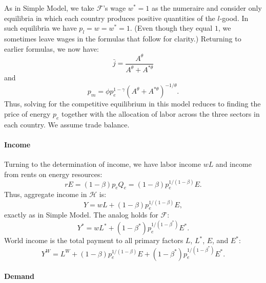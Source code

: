 \documentclass[notitlepage,12pt]{article}
\begin{document}
As in Simple Model, we take $\mathcal{F}$'s wage $w^{\ast }=1$ as the
numeraire and consider only equilibria in which each country produces
positive quantities of the $l$-good. In such equilibria we have $%
p_{l}=w=w^{\ast }=1$. (Even though they equal $1$, we sometimes leave wages
in the formulas that follow for clarity.) Returning to earlier formulas, we
now have:%
\begin{equation}
\bar{j}=\frac{A^{\theta }}{A^{\theta }+A^{\ast \theta }}  \label{jbar no tax}
\end{equation}%
and%
\begin{equation}
p_{m}=\phi p_{e}^{1-\gamma }\left( A^{\theta }+A^{\ast \theta }\right)
^{-1/\theta }.  \label{pm no tax}
\end{equation}%
Thus, solving for the competitive equilibrium in this model reduces to
finding the price of energy $p_{e}$ together with the allocation of labor
across the three sectors in each country. We assume trade balance.

\paragraph{Income}

Turning to the determination of income, we have labor income $wL$ and income
from rents on energy resources:%
\begin{equation*}
rE=\left( 1-\beta \right) p_{e}Q_{e}=\left( 1-\beta \right)
p_{e}^{1/(1-\beta )}E.
\end{equation*}%
Thus, aggregate income in $\mathcal{H}$ is:%
\begin{equation}
Y=wL+\left( 1-\beta \right) p_{e}^{1/(1-\beta )}E,  \label{Y no tax}
\end{equation}%
exactly as in Simple Model. The analog holds for $\mathcal{F}$:%
\begin{equation}
Y^{\ast }=wL^{\ast }+\left( 1-\beta ^{\ast }\right) p_{e}^{1/(1-\beta ^{\ast
})}E^{\ast }.  \label{Y star no tax}
\end{equation}%
World income is the total payment to all primary factors $L$, $L^{\ast }$, $%
E $, and $E^{\ast }$:%
\begin{equation}
Y^{W}=L^{W}+\left( 1-\beta \right) p_{e}^{1/(1-\beta )}E+\left( 1-\beta
^{\ast }\right) p_{e}^{1/(1-\beta ^{\ast })}E^{\ast }.  \label{Y^W no tax}
\end{equation}

\paragraph{Demand}
\end{document}
